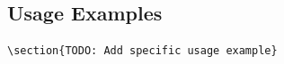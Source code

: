 \subsection{Usage Examples}

\begin{lstlisting}
\section{TODO: Add specific usage example}
\end{lstlisting}
